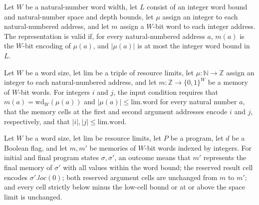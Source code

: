 \begin{definition}
\label{Light.Compiler.Holds}
\leanok
{}
Let $W$ be a natural-number word width, let $L$ consist of an integer word bound and
natural-number space and depth bounds, let $\mu$ assign an integer to each
natural-numbered address, and let $m$ assign a $W$-bit word to each integer address. The
representation is valid if, for every natural-numbered address $a$, $m(a)$ is the
$W$-bit encoding of $\mu(a)$, and $|\mu(a)|$ is at most the integer word bound in $L$.
\end{definition}

\begin{definition}
\label{Light.Compiler.Input}
\leanok
{}
Let $W$ be a word size, let $\mathrm{lim}$ be a triple of resource limits, let
$\mu\colon\mathbb{N}\to\mathbb{Z}$ assign an integer to each natural-numbered address,
and let $m\colon\mathbb{Z}\to\{0,1\}^W$ be a memory of $W$-bit words. For integers $i$
and $j$, the input condition requires that $m(a)=\mathrm{wd}_W(\mu(a))$ and
$|\mu(a)|\leq\mathrm{lim.word}$ for every natural number $a$, that the memory cells at
the first and second argument addresses encode $i$ and $j$, respectively, and that
$|i|,|j|\leq\mathrm{lim.word}$.
\end{definition}

\begin{definition}
\label{Light.Compiler.Outcome}
\leanok
{}
Let $W$ be a word size, let $\text{lim}$ be resource limits, let $P$ be a program, let
$d$ be a Boolean flag, and let $m,m'$ be memories of $W$-bit words indexed by integers.
For initial and final program states $\sigma,\sigma'$, an outcome means that $m'$
represents the final memory of $\sigma'$ with all values within the word bound; the
reserved result cell encodes $\sigma'.loc(0)$; both reserved argument cells are
unchanged from $m$ to $m'$; and every cell strictly below minus the low-cell bound or at
or above the space limit is unchanged.
\end{definition}


